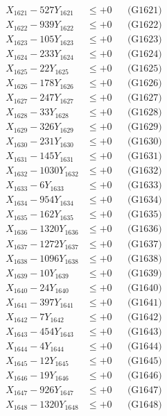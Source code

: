 \documentclass[a4paper,10pt]{article}
\begin{document}
{\begin{align}
\allowbreak
X_{1621} - 527Y_{1621} &\leq +0 && \text{(G1621)} \\
X_{1622} - 939Y_{1622} &\leq +0 && \text{(G1622)} \\
X_{1623} - 105Y_{1623} &\leq +0 && \text{(G1623)} \\
X_{1624} - 233Y_{1624} &\leq +0 && \text{(G1624)} \\
X_{1625} - 22Y_{1625} &\leq +0 && \text{(G1625)} \\
X_{1626} - 178Y_{1626} &\leq +0 && \text{(G1626)} \\
X_{1627} - 247Y_{1627} &\leq +0 && \text{(G1627)} \\
X_{1628} - 33Y_{1628} &\leq +0 && \text{(G1628)} \\
X_{1629} - 326Y_{1629} &\leq +0 && \text{(G1629)} \\
X_{1630} - 231Y_{1630} &\leq +0 && \text{(G1630)} \\
\allowbreak
X_{1631} - 145Y_{1631} &\leq +0 && \text{(G1631)} \\
X_{1632} - 1030Y_{1632} &\leq +0 && \text{(G1632)} \\
X_{1633} - 6Y_{1633} &\leq +0 && \text{(G1633)} \\
X_{1634} - 954Y_{1634} &\leq +0 && \text{(G1634)} \\
X_{1635} - 162Y_{1635} &\leq +0 && \text{(G1635)} \\
X_{1636} - 1320Y_{1636} &\leq +0 && \text{(G1636)} \\
X_{1637} - 1272Y_{1637} &\leq +0 && \text{(G1637)} \\
X_{1638} - 1096Y_{1638} &\leq +0 && \text{(G1638)} \\
X_{1639} - 10Y_{1639} &\leq +0 && \text{(G1639)} \\
X_{1640} - 24Y_{1640} &\leq +0 && \text{(G1640)} \\
\allowbreak
X_{1641} - 397Y_{1641} &\leq +0 && \text{(G1641)} \\
X_{1642} - 7Y_{1642} &\leq +0 && \text{(G1642)} \\
X_{1643} - 454Y_{1643} &\leq +0 && \text{(G1643)} \\
X_{1644} - 4Y_{1644} &\leq +0 && \text{(G1644)} \\
X_{1645} - 12Y_{1645} &\leq +0 && \text{(G1645)} \\
X_{1646} - 19Y_{1646} &\leq +0 && \text{(G1646)} \\
X_{1647} - 926Y_{1647} &\leq +0 && \text{(G1647)} \\
X_{1648} - 1320Y_{1648} &\leq +0 && \text{(G1648)} \\

\end{align}}
\end{document}
